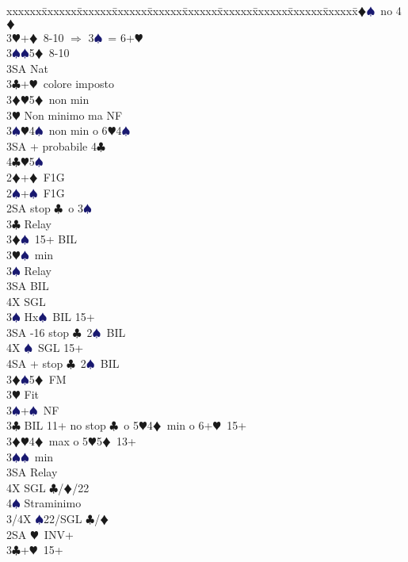 \documentclass[a4paper,italian]{article}
\newcommand{\BC}{\textcolor{OliveGreen}{$\clubsuit$}}
\newcommand{\BD}{\textcolor{RedOrange}{$\vardiamondsuit$}}
\newcommand{\BH}{\textcolor{Red2}{$\varheartsuit${}}}
\newcommand{\BS}{\textcolor{MidnightBlue}{$\spadesuit${}}}
\newenvironment{bidtable}
{\begin{tabbing}

    xxxxxx\=xxxxxx\=xxxxxx\=xxxxxx\=xxxxxx\=xxxxxx\=xxxxxx\=xxxxxx\=xxxxxx\=xxxxxx\=\kill}
{\end{tabbing} }%
\begin{document}
\begin{multicols}{2}
\begin{bidtable}
        3\BD {}\BS\ no 4\BD \\
        3\BH {}+\BD\ 8-10 $\Rightarrow$ 3\BS\ = 6+\BH\\
        3\BS {}\BS 5\BD\ 8-10\\
        3SA \> Nat\-\\
        3\BC {}+\BH\ colore imposto\\
        3\BD {}\BH 5\BD\ non min\\
        3\BH \> Non minimo ma NF\\
        3\BS {}\BH 4\BS\ non min o 6\BH 4\BS \\
        3SA + probabile 4\BC \\
        4\BC {}\BH 5\BS \-\\
        2\BD {}+\BD\ F1G\\
        2\BS {}+\BS\ F1G\+\\
        2SA  stop \BC\ o 3\BS \+\\
        3\BC \> Relay\+\\
        3\BD {}\BS\ 15+ BIL\\
        3\BH {}\BS\ min\+\\
        3\BS \> Relay\+\\
        3SA \> BIL\\
        4X \> SGL\-\-\\
        3\BS \> Hx\BS\ BIL 15+\\
        3SA -16 stop \BC\ 2\BS\ BIL\\
        4X \BS\ SGL 15+\\
        4SA + stop \BC\ 2\BS\ BIL\-\\
        3\BD {}\BS 5\BD\ FM\\
        3\BH \> Fit\\
        3\BS {}+\BS\ NF\-\\
        3\BC \> BIL 11+ no stop \BC\ o 5\BH 4\BD\ min o 6+\BH\ 15+\\
        3\BD {}\BH 4\BD\ max o 5\BH 5\BD\ 13+\\
        3\BS {}\BS\ min\+\\
        3SA \> Relay\+\\
        4X \> SGL \BC /\BD /22\\
        4\BS \> Straminimo\-\-\\
        3/4X \BS 22/SGL \BC /\BD \-\\
        2SA \BH\ INV+\+\\
        3\BC {}+\BH\ 15+\-\\

\end{bidtable}
\end{multicols}
\end{document}
